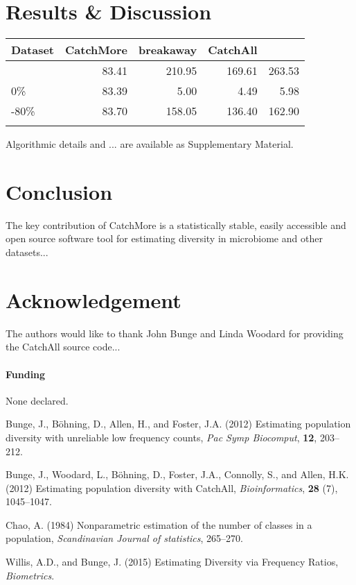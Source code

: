 \documentclass{bioinfo}
\begin{document}
\section{Results \& Discussion}
\begin{table}[!t]
{\begin{tabular}{lrrrr}\toprule
Dataset & CatchMore & breakaway & CatchAll \\\midrule
   & 83.41 & 210.95 & 169.61 & 263.53 \\
  0\% & 83.39 & 5.00 & 4.49 & 5.98\\
  -80\% & 83.70 & 158.05 & 136.40 & 162.90 \\
\botrule
\end{tabular}}{}
\end{table}


Algorithmic details and ... are available as Supplementary Material.

\section{Conclusion}
The key contribution of CatchMore is a statistically stable, easily accessible and open source software tool for estimating diversity in microbiome and other datasets...

\section*{Acknowledgement}
The authors would like to thank John Bunge and Linda Woodard for providing the CatchAll source code...
\paragraph{Funding\textcolon}
None declared.

\begin{thebibliography}{}
 Bunge, J., B{\"o}hning, D., Allen, H., and Foster, J.A. (2012) Estimating population diversity with unreliable low frequency counts, {\it Pac Symp Biocomput}, {\bf 12}, 203--212.

 Bunge, J., Woodard, L., B{\"o}hning, D., Foster, J.A., Connolly, S., and Allen, H.K. (2012) Estimating population diversity with CatchAll, {\it Bioinformatics}, {\bf 28} (7), 1045--1047.

 Chao, A. (1984) Nonparametric estimation of the number of classes in a population, {\it Scandinavian Journal of statistics}, 265--270.

 Willis, A.D., and Bunge, J. (2015) Estimating Diversity via Frequency Ratios, {\it Biometrics}.

\end{thebibliography}
\end{document}
